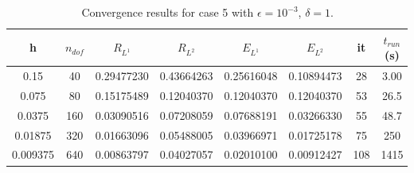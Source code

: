 \documentclass[11pt]{amsart}   	%
\theoremstyle{plain}
\numberwithin{equation}{section}
\begin{document}
\begin{table}[H]
    \centering
    \caption{Convergence results for case 5 with $\epsilon=10^{-3}$, $\delta=1$.}%
    \begin{tabular}{|c|c||c|c||c|c||c|c|}
    \hline
    h & $n_{dof}$ & $R_{L^1}$ & $R_{L^2} $  & $E_{L^1}$ & $E_{L^2}$ & it & $t_{run}$ (s)
    \\ \hline
    0.15 & 40 & 0.29477230 & 0.43664263 &0.25616048  & 0.10894473 & 28 & 3.00
    \\ \hline
    0.075 & 80 & 0.15175489 & 0.12040370 & 0.12040370 & 0.12040370 & 53 &  26.5   
    \\ \hline
    0.0375 &160 & 0.03090516 & 0.07208059 & 0.07688191 &  0.03266330 & 55 & 48.7
    \\ \hline
    0.01875 & 320 & 0.01663096 & 0.05488005 & 0.03966971 & 0.01725178 & 75 & 250    
    \\ \hline
    0.009375 & 640 & 0.00863797 & 0.04027057 &0.02010100& 0.00912427 & 108 & 1415 
    \\ \hline  
    \end{tabular}
    \label{tab:num_case_5}
\end{table}




\end{document}
